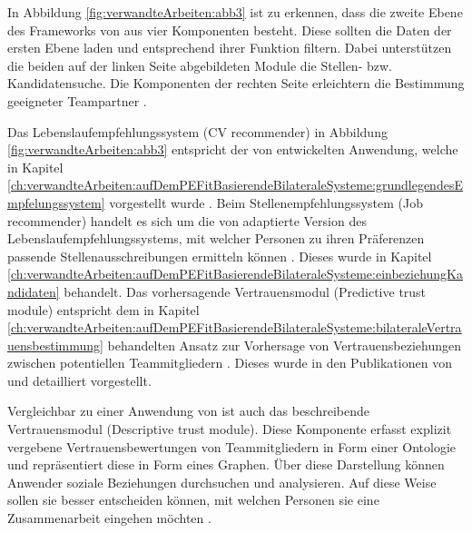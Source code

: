 In Abbildung \ref{fig:verwandteArbeiten:abb3} ist zu erkennen, dass die zweite Ebene des Frameworks von \textcite[S. 5ff.]{keim:2007} aus vier Komponenten besteht. Diese sollten die Daten der ersten Ebene laden und entsprechend ihrer Funktion filtern. Dabei unterstützen die beiden auf der linken Seite abgebildeten Module die Stellen- bzw. Kandidatensuche. Die Komponenten der rechten Seite erleichtern die Bestimmung geeigneter Teampartner \cite[S. 5]{keim:2007}.

Das Lebenslaufempfehlungssystem (CV recommender) in Abbildung \ref{fig:verwandteArbeiten:abb3} entspricht der von \textcite[S. 8ff.]{faerber:2003} entwickelten Anwendung, welche in Kapitel \ref{ch:verwandteArbeiten:aufDemPEFitBasierendeBilateraleSysteme:grundlegendesEmpfelungssystem} vorgestellt wurde \cite[S. 6]{keim:2007}. Beim Stellenempfehlungssystem (Job recommender) handelt es sich um die von \textcite[S. 4ff.]{malinowski:2006} adaptierte Version des Lebenslaufempfehlungssystems, mit welcher Personen zu ihren Präferenzen passende Stellenausschreibungen ermitteln können \cite[S. 6]{keim:2007}. Dieses wurde in Kapitel \ref{ch:verwandteArbeiten:aufDemPEFitBasierendeBilateraleSysteme:einbeziehungKandidaten} behandelt. Das vorhersagende Vertrauensmodul (Predictive trust module) entspricht dem in Kapitel \ref{ch:verwandteArbeiten:aufDemPEFitBasierendeBilateraleSysteme:bilateraleVertrauensbestimmung} behandelten Ansatz zur Vorhersage von Vertrauensbeziehungen zwischen potentiellen Teammitgliedern \cite[S. 8]{keim:2007}. Dieses wurde in den Publikationen von \textcite[S. 5ff.]{keim:2005} und \textcite[S. 4ff.]{malinowski:2005} detailliert vorgestellt.

Vergleichbar zu einer Anwendung von \textcite[S. 4f.]{keim:2005} ist auch das beschreibende Vertrauensmodul (Descriptive trust module). Diese Komponente erfasst explizit vergebene Vertrauensbewertungen von Teammitgliedern in Form einer Ontologie und repräsentiert diese in Form eines Graphen. Über diese Darstellung können Anwender soziale Beziehungen durchsuchen und analysieren. Auf diese Weise sollen sie besser entscheiden können, mit welchen Personen sie eine Zusammenarbeit eingehen möchten \cite[S. 7]{keim:2007}.


